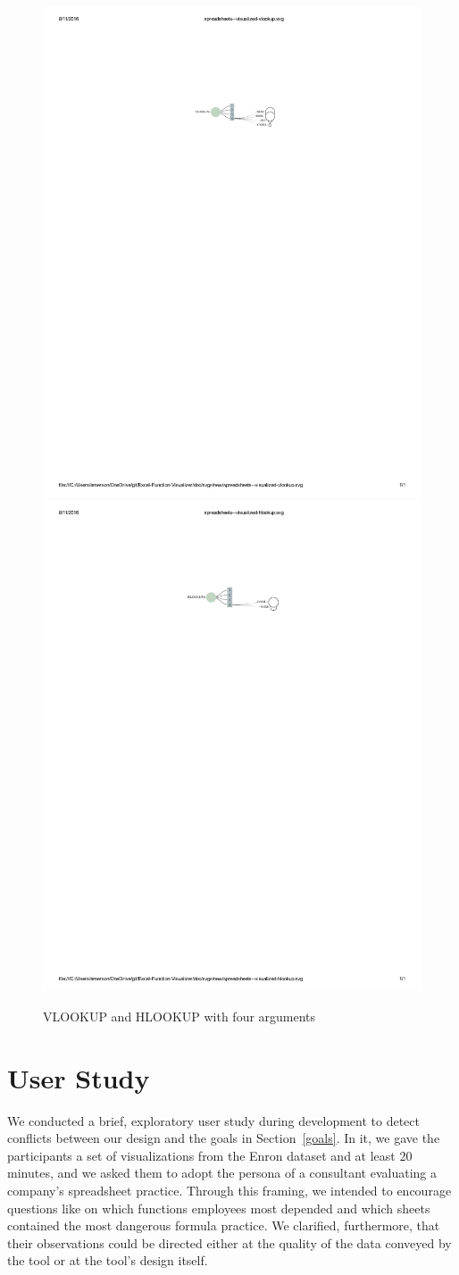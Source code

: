 \documentclass[conference]{IEEEtran}
\begin{document}
	\begin{figure}[h] \centering \includegraphics[width=.5\textwidth]{vlookup}
		\includegraphics[width=.5\textwidth]{hlookup} \caption{VLOOKUP and HLOOKUP with
			four arguments} \label{fig:vhlookups}\end{figure}
	
	\section{User Study} \label{sec:userstudy} 

	We conducted a brief, exploratory user study during development to detect
	conflicts between our design and the goals in Section~\ref{goals}. In it, we
	gave the participants a set of visualizations from the Enron dataset and at
	least 20 minutes, and we asked them to adopt the persona of a consultant
	evaluating a company's spreadsheet practice. Through this framing, we intended
	to encourage questions like on which functions employees most depended
	and which sheets contained the most dangerous formula practice. We clarified,
	furthermore, that their observations could be directed either at the quality of
	the data conveyed by the tool or at the tool's design itself.
	
\end{document}

